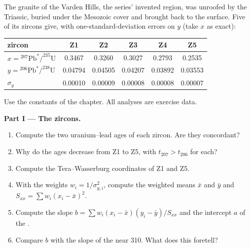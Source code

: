 \begin{problem}\label{pb:b3:advanced-geochronology:1}
The granite of the Varden Hills, the series' invented region, was unroofed
by the Triassic, buried under the Mesozoic cover and brought back to the
surface. Five of its zircons give, with one-standard-deviation errors on $y$
(take $x$ as exact):
\begin{center}
\small
\begin{tabular}{|l|ccccc|}
\hline
zircon & Z1 & Z2 & Z3 & Z4 & Z5 \\
\hline
$x = {}^{207}\mathrm{Pb}^*/^{235}\mathrm U$ & 0.3467 & 0.3260 & 0.3027 & 0.2793 & 0.2535 \\
$y = {}^{206}\mathrm{Pb}^*/^{238}\mathrm U$ & 0.04794 & 0.04505 & 0.04207 & 0.03892 & 0.03553 \\
$\sigma_y$ & 0.00010 & 0.00009 & 0.00008 & 0.00008 & 0.00007 \\
\hline
\end{tabular}
\end{center}
Use the constants of the chapter. All analyses are exercise data.

\medskip\noindent\textbf{Part I --- The zircons.}
\begin{enumerate}
\item Compute the two uranium--lead ages of each zircon. Are they concordant?
\item Why do the ages decrease from Z1 to Z5, with $t_{207} > t_{206}$ for
each?
\item Compute the Tera--Wasserburg coordinates of Z1 and Z5.
\item With the weights $w_i = 1/\sigma_{y,i}^2$, compute the weighted means
$\bar x$ and $\bar y$ and $S_{xx} = \sum w_i(x_i - \bar x)^2$.
\item Compute the slope $b = \sum w_i(x_i - \bar x)(y_i - \bar y)/S_{xx}$ and
the intercept $a$ of the .
\item Compare $b$ with the slope of the  near \qty{310}{\Ma}. What
does this foretell?
\end{enumerate}


\end{problem}
